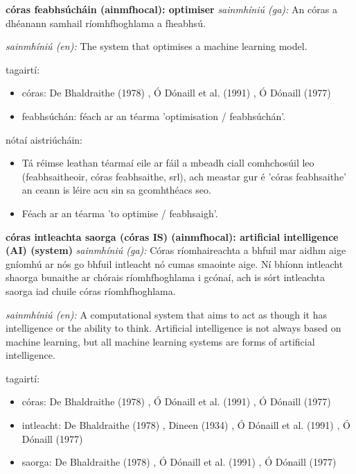 \documentclass{article}
\begin{document}
\textbf{córas feabhsúcháin (ainmfhocal): optimiser}
\textit{sainmhíniú (ga):} An córas a dhéanann samhail ríomhfhoghlama a fheabhsú.

\textit{sainmhíniú (en):} The system that optimises a machine learning model.

tagairtí:
\begin{itemize}
	\item córas: De Bhaldraithe (1978) \cite{de-bhaldraithe}, Ó Dónaill et al. (1991) \cite{focloir-beag}, Ó Dónaill (1977) \cite{odonaill}
	\item feabhsúchán: féach ar an téarma 'optimisation / feabhsúchán'.
\end{itemize}

nótaí aistriúcháin:
\begin{itemize}
	\item Tá réimse leathan téarmaí eile ar fáil a mbeadh ciall comhchosúil leo (feabhsaitheoir, córas feabhsaithe, srl), ach meastar gur é 'córas feabhsaithe' an ceann is léire acu sin sa gcomhthéacs seo.
	\item Féach ar an téarma 'to optimise / feabhsaigh'.
\end{itemize}


\textbf{córas intleachta saorga (córas IS) (ainmfhocal): artificial intelligence (AI) (system)}
\textit{sainmhíniú (ga):} Córas ríomhaireachta a bhfuil mar aidhm aige gníomhú ar nós go bhfuil intleacht nó cumas smaointe aige. Ní bhíonn intleacht shaorga bunaithe ar chórais ríomhfhoghlama i gcónaí, ach is sórt intleachta saorga iad chuile córas ríomhfhoghlama.

\textit{sainmhíniú (en):} A computational system that aims to act as though it has intelligence or the ability to think. Artificial intelligence is not always based on machine learning, but all machine learning systems are forms of artificial intelligence.

tagairtí:
\begin{itemize}
	\item córas: De Bhaldraithe (1978) \cite{de-bhaldraithe}, Ó Dónaill et al. (1991) \cite{focloir-beag}, Ó Dónaill (1977) \cite{odonaill}
	\item intleacht: De Bhaldraithe (1978) \cite{de-bhaldraithe}, Dineen (1934) \cite{dineen}, Ó Dónaill et al. (1991) \cite{focloir-beag}, Ó Dónaill (1977) \cite{odonaill}
	\item saorga: De Bhaldraithe (1978) \cite{de-bhaldraithe}, Ó Dónaill et al. (1991) \cite{focloir-beag}, Ó Dónaill (1977) \cite{odonaill}
\end{itemize}
\end{document}
